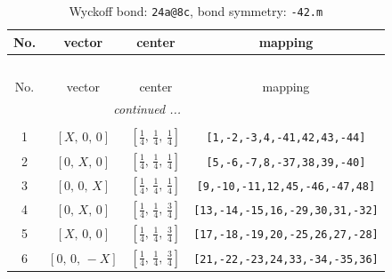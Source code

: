 \documentclass[fleqn,8pt]{jsarticle}
\begin{document}
\begin{longtable}{cccc}
\caption{Wyckoff bond: {\tt 24a@8c}, bond symmetry: {\tt -42.m}}
 \\
 \hline \hline
No. & vector & center & mapping \\ \hline \endfirsthead

\multicolumn{3}{l}{\tablename\ \thetable{}} \\
 \hline \hline
No. & vector & center & mapping \\ \hline \endhead

 \hline \hline
\multicolumn{3}{r}{\footnotesize\it continued ...} \\ \endfoot

 \hline \hline
\multicolumn{3}{r}{} \\ \endlastfoot

1 & $\left[ X,\, 0,\, 0 \right]$ & $\left[ \frac{1}{4},\, \frac{1}{4},\, \frac{1}{4} \right]$ & {\tt [1,-2,-3,4,-41,42,43,-44]} \\ \hline
2 & $\left[ 0,\, X,\, 0 \right]$ & $\left[ \frac{1}{4},\, \frac{1}{4},\, \frac{1}{4} \right]$ & {\tt [5,-6,-7,8,-37,38,39,-40]} \\ \hline
3 & $\left[ 0,\, 0,\, X \right]$ & $\left[ \frac{1}{4},\, \frac{1}{4},\, \frac{1}{4} \right]$ & {\tt [9,-10,-11,12,45,-46,-47,48]} \\ \hline
4 & $\left[ 0,\, X,\, 0 \right]$ & $\left[ \frac{1}{4},\, \frac{1}{4},\, \frac{3}{4} \right]$ & {\tt [13,-14,-15,16,-29,30,31,-32]} \\ \hline
5 & $\left[ X,\, 0,\, 0 \right]$ & $\left[ \frac{1}{4},\, \frac{1}{4},\, \frac{3}{4} \right]$ & {\tt [17,-18,-19,20,-25,26,27,-28]} \\ \hline
6 & $\left[ 0,\, 0,\, - X \right]$ & $\left[ \frac{1}{4},\, \frac{1}{4},\, \frac{3}{4} \right]$ & {\tt [21,-22,-23,24,33,-34,-35,36]} \\
\end{longtable}
\renewcommand{\arraystretch}{1.2}
\end{document}
